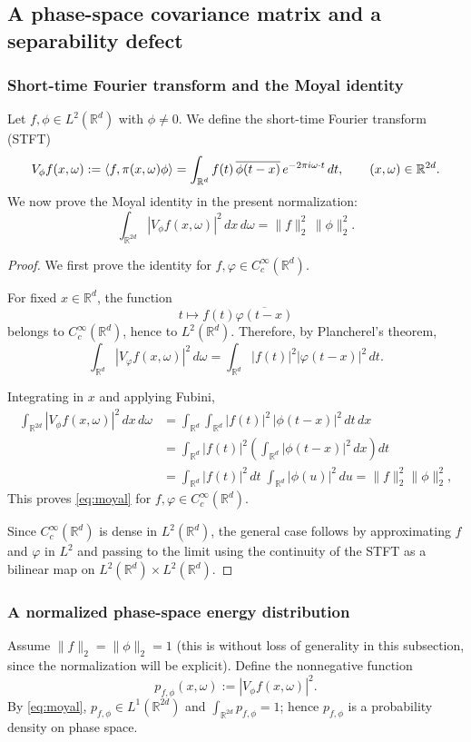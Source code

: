 \documentclass[final,1p,times,authoryear]{elsarticle}
\theoremstyle{definition}
\newcommand{\R}{\mathbb{R}}
\newcommand{\1}{\mathbf{1}}
\DeclarePairedDelimiter{\inner}{\langle}{\rangle}
\begin{document}
\subsection{A phase-space covariance matrix and a separability defect}\label{subsec:covariance}

\subsubsection{Short-time Fourier transform and the Moyal identity}
Let $f,\phi\in L^2(\R^d)$ with $\phi\neq 0$. We define the short-time Fourier transform (STFT)
$$
V_\phi f(x,\omega):=\inner{f,\pi(x,\omega)\phi}
=\int_{\R^d} f(t)\,\overline{\phi(t-x)}\,e^{-2\pi i \omega\cdot t}\,dt,
\qquad (x,\omega)\in\R^{2d}.
$$
We now prove the Moyal identity in the present normalization:
\begin{equation}\label{eq:moyal}
\int_{\R^{2d}} |V_\phi f(x,\omega)|^2\,dx\,d\omega
=
\|f\|_2^2\,\|\phi\|_2^2.
\end{equation}
\begin{proof}
{We first prove the identity for
$f,\varphi\in C_c^\infty(\mathbb R^d)$.}

{
For fixed $x\in\mathbb R^d$, the function
$$
t\mapsto f(t)\overline{\varphi(t-x)}
$$
belongs to $C_c^\infty(\mathbb R^d)$,
hence to $L^2(\mathbb R^d)$.
Therefore, by Plancherel's theorem,
$$
\int_{\mathbb R^d}
|V_\varphi f(x,\omega)|^2\,d\omega
=
\int_{\mathbb R^d}
|f(t)|^2|\varphi(t-x)|^2\,dt.
$$}


Integrating in $x$ and applying Fubini,
\begin{align*}
\int_{\R^{2d}} |V_\phi f(x,\omega)|^2\,dx\,d\omega
&=
\int_{\R^d}\int_{\R^d} |f(t)|^2\,|\phi(t-x)|^2\,dt\,dx\\
&=
\int_{\R^d} |f(t)|^2\left(\int_{\R^d}|\phi(t-x)|^2\,dx\right)dt\\
&=
\int_{\R^d}|f(t)|^2\,dt\;\int_{\R^d}|\phi(u)|^2\,du
=
\|f\|_2^2\|\phi\|_2^2,
\end{align*}
{This proves \eqref{eq:moyal} for
$f,\varphi\in C_c^\infty(\mathbb R^d)$.}

{
Since $C_c^\infty(\mathbb R^d)$ is dense in
$L^2(\mathbb R^d)$, the general case follows by
approximating $f$ and $\varphi$ in $L^2$ and passing
to the limit using the continuity of the STFT
as a bilinear map on $L^2(\mathbb R^d)\times
L^2(\mathbb R^d)$.}
\end{proof}

\subsubsection{A normalized phase-space energy distribution}
Assume $\|f\|_2=\|\phi\|_2=1$ (this is without loss of generality in this subsection, since the normalization
will be explicit). Define the nonnegative function
$$
p_{f,\phi}(x,\omega):=|V_\phi f(x,\omega)|^2.
$$
By \eqref{eq:moyal}, $p_{f,\phi}\in L^1(\R^{2d})$ and $\int_{\R^{2d}} p_{f,\phi}=1$; hence
$p_{f,\phi}$ is a probability density on phase space.
\end{document}
